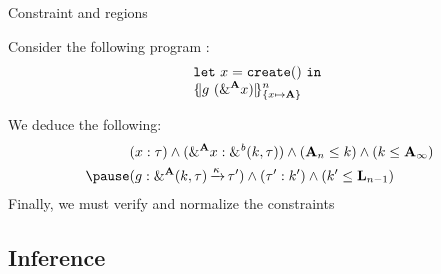 \documentclass[xcolor=svgnames,11pt]{beamer}
\begin{document}
\begin{frame}{Constraint and regions}

  Consider the following program : 
\[
  \setlength{\jot}{-1pt}
  \begin{aligned}
  &\letin{x}{\texttt{create} ()}{}\\
  &\region[n]{\Sone x\MBORROW}{g\ (\borrow[\kaff]{x})}\\
\end{aligned}
\]\pause

We deduce the following:
\begin{align*}
  &(x : \tau) \wedge (\borrow[\kaff]{x} : \borrowty{k}{\tau}) \wedge
  (\kaff_{n} \leq k) \wedge (k \leq \kaff_{\infty})\\\pause
  &(g : \borrowty[\kaff]{k}{\tau}\tarr{\kvar}\tau') \wedge (\tau' : k') \wedge
  (k' \leq \klin_{n-1})
\end{align*}
\pause
Finally, we must verify and normalize the constraints

\end{frame}


\subsection{Inference}





\end{document}
